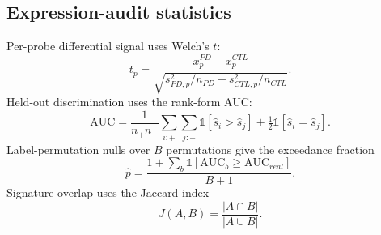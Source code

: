 \subsection{Expression-audit statistics}
Per-probe differential signal uses Welch's $t$:
\begin{equation} t_p = \frac{\bar x^{PD}_p - \bar x^{CTL}_p}{\sqrt{s_{PD,p}^2/n_{PD} + s_{CTL,p}^2/n_{CTL}}}. \end{equation}
Held-out discrimination uses the rank-form AUC:
\begin{equation} \mathrm{AUC} = \frac{1}{n_+ n_-} \sum_{i:+}\sum_{j:-} \mathbb{1}[\hat s_i > \hat s_j] + \tfrac12 \mathbb{1}[\hat s_i = \hat s_j]. \end{equation}
Label-permutation nulls over $B$ permutations give the exceedance fraction
\begin{equation} \hat p = \frac{1 + \sum_b \mathbb{1}[\mathrm{AUC}_b \ge \mathrm{AUC}_{real}]}{B+1}. \end{equation}
Signature overlap uses the Jaccard index
\begin{equation} J(A,B) = \frac{|A \cap B|}{|A \cup B|}. \end{equation}
